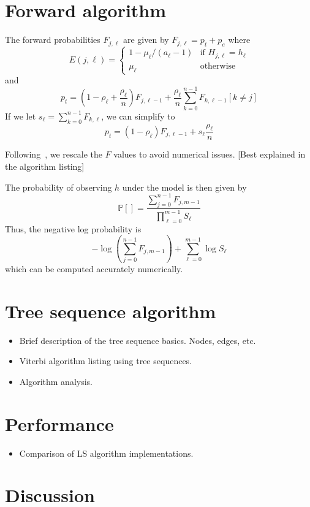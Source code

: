 \documentclass{article}
\begin{document}
\section{Forward algorithm}

The forward probabilities $F_{j, \ell}$ are given by $F_{j, \ell} = p_t + p_e$
where
\begin{equation}
E(j, \ell) = \begin{cases}
1 - \mu_\ell / (a_\ell - 1)  & \text{if $H_{j, \ell} = h_{\ell}$} \\
\mu_\ell & \text{otherwise}
\end{cases}
\end{equation}
and
\[
p_t = \left(1 - \rho_\ell + \frac{\rho_\ell}{n} \right) F_{j, \ell - 1}
+ \frac{\rho_\ell}{n} \sum_{k = 0}^{n - 1} F_{k, \ell - 1} [k \neq j]
\]
If we let $s_\ell = \sum_{k = 0}^{n - 1} F_{k, \ell}$, we can simplify to
\[
p_t = (1 - \rho_\ell)F_{j, \ell - 1} + s_\ell \frac{\rho_\ell}{n}
\]

Following~\cite{durbin1998biological}, we rescale the $F$ values to avoid
numerical issues. [Best explained in the algorithm listing]

The probability of observing $h$ under the model is then given by
\[
\mathbb{P}[] = \frac{\sum_{j = 0}^{n - 1} F_{j, m - 1}}{
\prod_{\ell=0}^{m - 1} S_\ell}
\]
Thus, the negative log probability is
\[
-\log\left(\sum_{j = 0}^{n - 1} F_{j, m - 1}\right)
+ \sum_{\ell=0}^{m -1} \log S_\ell
\]
which can be computed accurately numerically.


\section{Tree sequence algorithm}

\begin{itemize}
\item Brief description of the tree sequence basics. Nodes, edges, etc.
\item Viterbi algorithm listing using tree sequences.
\item Algorithm analysis.
\end{itemize}

\section{Performance}

\begin{itemize}
\item Comparison of LS algorithm implementations.
\end{itemize}


\section{Discussion}


\end{document}
